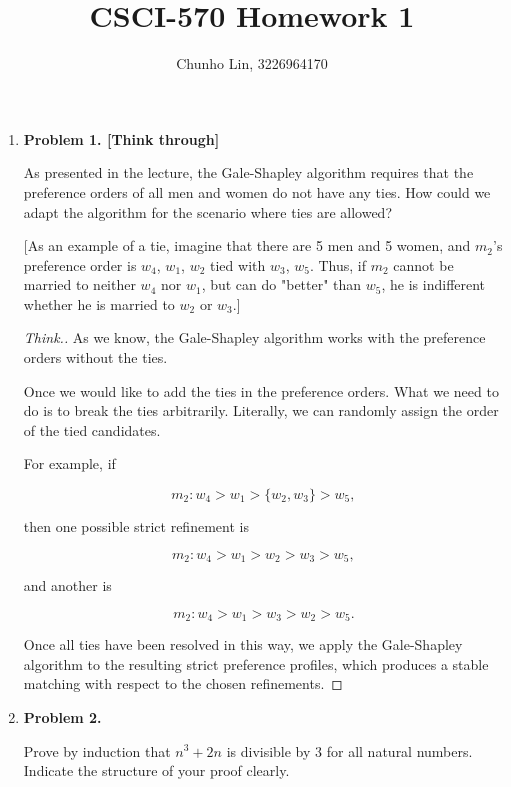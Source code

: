 \documentclass[11pt]{article}
\begin{document}
\author{Chunho Lin, 3226964170}
\title{CSCI-570 Homework 1}
\maketitle

\medskip

\begin{enumerate}

\item
\textbf{Problem 1. [Think through]}

As presented in the lecture, the Gale-Shapley algorithm requires that the preference orders of all men and women do not have any ties. How could we adapt the algorithm for the scenario where ties are allowed?

[As an example of a tie, imagine that there are 5 men and 5 women, and $m_2$'s preference order is $w_4$, $w_1$, $w_2$ tied with $w_3$, $w_5$. Thus, if $m_2$ cannot be married to neither $w_4$ nor $w_1$, but can do "better" than $w_5$, he is indifferent whether he is married to $w_2$ or $w_3$.]

\begin{proof}[Think.]

As we know, the Gale-Shapley algorithm works with the preference orders without the ties.

Once we would like to add the ties in the preference orders. What we need to do is to break the ties arbitrarily. Literally, we can randomly assign the order of the tied candidates.

For example, if

$$
{m_2} : w_4 > w_1 > \{w_2, w_3\} > w_5,
$$

then one possible strict refinement is

$$
{m_2} : w_4 > w_1 > w_2 > w_3 > w_5,
$$

and another is

$$
{m_2} : w_4 > w_1 > w_3 > w_2 > w_5.
$$

Once all ties have been resolved in this way, we apply the Gale-Shapley algorithm to the resulting strict preference profiles, which produces a stable matching with respect to the chosen refinements.

\end{proof}

\item
\textbf{Problem 2.}

Prove by induction that \(n^3 + 2n\) is divisible by \(3\) for all natural numbers. Indicate the structure of your proof clearly.


\end{enumerate}
\end{document}
